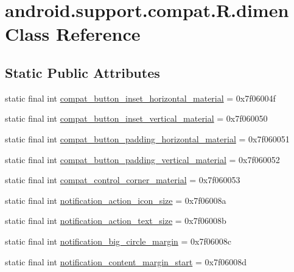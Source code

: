 \hypertarget{classandroid_1_1support_1_1compat_1_1R_1_1dimen}{}\section{android.\+support.\+compat.\+R.\+dimen Class Reference}
\label{classandroid_1_1support_1_1compat_1_1R_1_1dimen}
\subsection*{Static Public Attributes}
\begin{DoxyCompactItemize}
\item 
static final int \mbox{\hyperlink{classandroid_1_1support_1_1compat_1_1R_1_1dimen_a33e6491b341d517a375ea9c0f0fc52b5}{compat\+\_\+button\+\_\+inset\+\_\+horizontal\+\_\+material}} = 0x7f06004f
\item 
static final int \mbox{\hyperlink{classandroid_1_1support_1_1compat_1_1R_1_1dimen_a6975ac1dada1db38a8352cf9b8d92583}{compat\+\_\+button\+\_\+inset\+\_\+vertical\+\_\+material}} = 0x7f060050
\item 
static final int \mbox{\hyperlink{classandroid_1_1support_1_1compat_1_1R_1_1dimen_a603e1a2062ab6d24601f6736f8e28da0}{compat\+\_\+button\+\_\+padding\+\_\+horizontal\+\_\+material}} = 0x7f060051
\item 
static final int \mbox{\hyperlink{classandroid_1_1support_1_1compat_1_1R_1_1dimen_a32b444450ecc285cf14a41708b7b6130}{compat\+\_\+button\+\_\+padding\+\_\+vertical\+\_\+material}} = 0x7f060052
\item 
static final int \mbox{\hyperlink{classandroid_1_1support_1_1compat_1_1R_1_1dimen_abb3c997f1c28c56a9d2a9772fe316dea}{compat\+\_\+control\+\_\+corner\+\_\+material}} = 0x7f060053
\item 
static final int \mbox{\hyperlink{classandroid_1_1support_1_1compat_1_1R_1_1dimen_a70b7aeaab5146075665eb2ffc821ed8f}{notification\+\_\+action\+\_\+icon\+\_\+size}} = 0x7f06008a
\item 
static final int \mbox{\hyperlink{classandroid_1_1support_1_1compat_1_1R_1_1dimen_a62cb588e7929184344c9b70c35e5c8f3}{notification\+\_\+action\+\_\+text\+\_\+size}} = 0x7f06008b
\item 
static final int \mbox{\hyperlink{classandroid_1_1support_1_1compat_1_1R_1_1dimen_ad5143045de575d03994fd52f70061270}{notification\+\_\+big\+\_\+circle\+\_\+margin}} = 0x7f06008c
\item 
static final int \mbox{\hyperlink{classandroid_1_1support_1_1compat_1_1R_1_1dimen_a87055ffdc6b8120cc5fc23f2b170e1b2}{notification\+\_\+content\+\_\+margin\+\_\+start}} = 0x7f06008d

\end{DoxyCompactItemize}
